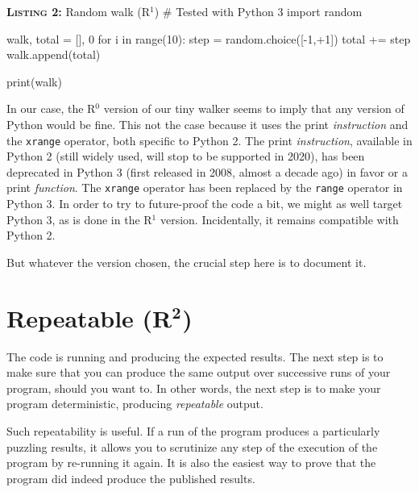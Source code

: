 % 
% 
%
\begin{code}{\textbf{\textsc{Listing 2:}} Random walk (R$^1$)}
# Tested with Python 3
import random

walk, total = [], 0
for i in range(10):
    step = random.choice([-1,+1])     
    total += step
    walk.append(total)
    
print(walk)
\end{code}

In our case, the R$^0$ version of our tiny walker seems to imply
that any version of Python would be fine.
This not the case because it uses the print {\em instruction} and the {\tt xrange} operator, both specific to Python 2.
The print {\em instruction}, available in Python 2 (still widely used, will stop to be supported in 2020), 
has been deprecated in Python 3 (first released in 2008, almost a decade ago)
in favor or a  print {\em function}.
The {\tt xrange} operator has been replaced by the {\tt range} operator in Python 3.
In order to try to future-proof the code a bit, we might as well target Python 3, as is done in the R$^1$ version.
Incidentally, it remains compatible with Python 2.

But whatever the version chosen,
the crucial step here is to document it.


\clearpage
\section*{Repeatable (R$^{\mathbf 2}$)}

% 
% 
% 

The code is running and producing the expected results. 
The next step is to make sure that you can produce the same output over successive runs of your program, 
should you want to. 
In other words, the next step is to make your program deterministic, 
producing {\em repeatable} output. 

Such repeatability is useful. 
If a run of the program produces a particularly puzzling results, 
it allows you to scrutinize any step of the execution of the program by re-running it again. 
It is also the easiest way to prove that the program did indeed produce the published results.

